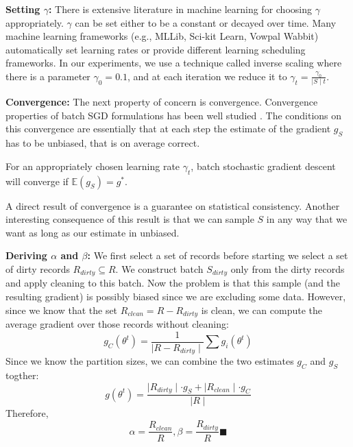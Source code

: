 \vspace{0.5em}

\noindent\textbf{ Setting $\gamma$: } There is extensive literature in machine learning for choosing $\gamma$ appropriately. $\gamma$ can be set either to be a constant or decayed over time. Many machine learning frameworks (e.g., MLLib, Sci-kit Learn, Vowpal Wabbit) automatically set learning rates or provide different learning scheduling frameworks. 
In our experiments, we use a technique called inverse scaling where there is a parameter $\gamma_0=0.1$, and at each iteration we reduce it to $\gamma_t = \frac{\gamma_0}{\mid S \mid t}$. 

\vspace{0.5em}

\noindent\textbf{ Convergence: } The next property of concern is convergence. Convergence properties of batch SGD formulations has been well studied \cite{dekel2012optimal}. 
The conditions on this convergence are essentially that at each step the estimate of the gradient $g_S$ has to be unbiased, that is on average correct. 

\begin{proposition}
For an appropriately chosen learning rate $\gamma_t$, batch stochastic gradient descent will converge if $\mathbb{E}(g_S)=g^*$.
\label{unbiased}
\end{proposition}

A direct result of convergence is a guarantee on statistical consistency.
Another interesting consequence of this result is that we can sample $S$ in any way that we want
as long as our estimate in unbiased.

\vspace{0.5em}

\noindent\textbf{Deriving $\alpha$ and $\beta$: }
We first select a set of records before starting we select a set of dirty records $R_{dirty} \subseteq R$. 
We construct batch $S_{dirty}$ only from the dirty records and apply cleaning to this batch.
Now the problem is that this sample (and the resulting gradient) is possibly biased since we are excluding some data.
However, since we know that the set $R_{clean} = R - R_{dirty}$ is clean, we can compute the average gradient over those records without cleaning:
\[
g_C(\theta^{t}) = \frac{1}{\mid R - R_{dirty} \mid} \sum g_i(\theta^{t})
\]
Since we know the partition sizes, we can combine the two estimates $g_C$ and $g_S$ togther:
\[
g(\theta^{t}) = \frac{\mid R_{dirty} \mid \cdot g_S + \mid R_{clean} \mid \cdot g_C  }{\mid R \mid}
\]
Therefore,
\[
\alpha = \frac{R_{clean}}{R}, \beta = \frac{R_{dirty}}{R} \blacksquare
\]

